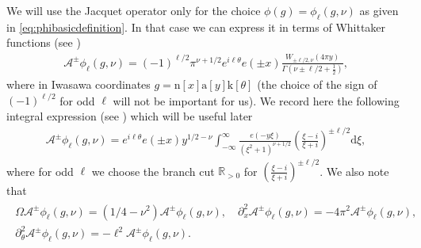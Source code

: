 \documentclass[12pt]{amsart}
\theoremstyle{definition}
\theoremstyle{remark}
\numberwithin{equation}{section}
\newcommand{\R}{{\mathbb R}}
\newcommand{\1}{{\mathbf 1}}
\renewcommand{\a}{\mathrm{a}}
\newcommand{\n}{\mathrm{n}}
\renewcommand{\k}{\mathrm{k}}
\renewcommand{\d}{\mathrm d}
\renewcommand{\n}{\mathrm{n}}
\begin{document}
We will use the Jacquet operator only for the choice $\phi(g)=\phi_\ell (g,\nu)$ as given in \eqref{eq:phibasicdefinition}. In that case we can express it in terms of Whittaker functions  (see \cite[eq. (16.1)]{motohashielements})
\begin{align}\label{eq:Jacq=Whit}
       \mathcal{A}^\pm \phi_\ell(g,\nu)=(-1)^{\ell/2} \pi^{\nu+1/2} e^{i\ell  \theta} e(\pm x) \frac{W_{\pm \ell/2, \nu}(4\pi y)}{\Gamma(\nu \pm \ell/2 +\frac{1}{2})},
\end{align}
where in Iwasawa coordinates $g=\n[x]\a[y] \k[\theta]$ (the choice of the sign of $(-1)^{\ell/2}$ for odd $\ell$ will not be important for us). We record here the following integral expression (see \cite[eq. (16.2)]{motohashielements}) which will be useful later 
\begin{align}\label{eq:Jacquetintegral}
    \mathcal{A}^{\pm} \phi_{\ell}(g,\nu)=e^{i\ell  \theta} e(\pm x) y^{1/2-\nu} \int_{-\infty}^\infty \frac{e(-y\xi) }{(\xi^2+1)^{\nu+1/2}} \left(\frac{\xi-i}{\xi+i} \right)^{\pm \ell/2} \d \xi,
\end{align}
where for odd $\ell$ we choose the branch cut  $\R_{> 0}$ for $(\frac{\xi-i}{\xi+i} )^{\pm \ell/2}$.
We also note that
\begin{align}\label{eq:Jacdiffop}\begin{split}
    \Omega \mathcal{A}^{\pm} \phi_{\ell}(g,\nu) =(1/4-\nu^2) \mathcal{A}^{\pm} \phi_{\ell}(g,\nu), \quad   \partial_x^2 \mathcal{A}^{\pm} \phi_{\ell}(g,\nu) = -4 \pi^2 \mathcal{A}^{\pm} \phi_{\ell}(g,\nu), \\ \partial_\theta^2 \mathcal{A}^{\pm} \phi_{\ell}(g,\nu) = -  \ell^2 \mathcal{A}^{\pm} \phi_{\ell}(g,\nu). 
\end{split}
\end{align}
\end{document}
